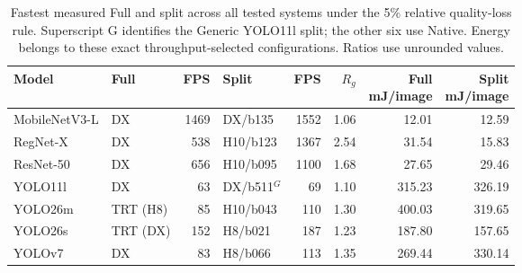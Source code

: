 \begin{table}[!htb]
\centering\small\setlength{\tabcolsep}{3pt}
\caption{Fastest measured Full and split across all tested systems under the 5\% relative quality-loss rule. Superscript G identifies the Generic YOLO11l split; the other six use Native. Energy belongs to these exact throughput-selected configurations. Ratios use unrounded values.}
\label{tab:evaluation:global_winners}

\begin{tabular}{@{}llrlrrrr@{}}
\toprule
Model & Full & FPS & Split & FPS & $R_g$ & \shortstack{Full\\mJ/image} & \shortstack{Split\\mJ/image} \\
\midrule
MobileNetV3-L & DX & 1469 & DX/b135 & 1552 & 1.06 & 12.01 & 12.59 \\
RegNet-X & DX & 538 & H10/b123 & 1367 & 2.54 & 31.54 & 15.83 \\
ResNet-50 & DX & 656 & H10/b095 & 1100 & 1.68 & 27.65 & 29.46 \\
YOLO11l & DX & 63 & DX/b511$^{G}$ & 69 & 1.10 & 315.23 & 326.19 \\
YOLO26m & TRT (H8) & 85 & H10/b043 & 110 & 1.30 & 400.03 & 319.65 \\
YOLO26s & TRT (DX) & 152 & H8/b021 & 187 & 1.23 & 187.80 & 157.65 \\
YOLOv7 & DX & 83 & H8/b066 & 113 & 1.35 & 269.44 & 330.14 \\
\bottomrule
\end{tabular}
\end{table}
